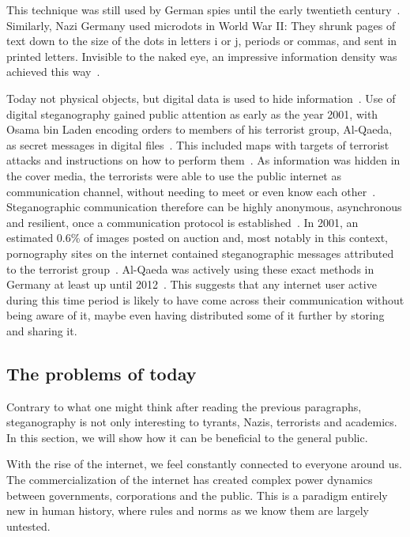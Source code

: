 This technique was still used by German spies until the early twentieth century~\cite{petitcolasInformationHidingSurvey1999}. Similarly, Nazi Germany used microdots in World War II: They shrunk pages of text down to the size of the dots in letters i or j, periods or commas, and sent in printed letters. Invisible to the naked eye, an impressive information density was achieved this way~\cite{dembartEndUserHide2001,petitcolasInformationHidingSurvey1999}.

Today not physical objects, but digital data is used to hide information~\cite{bennettLinguisticSteganographySurvey2004}. Use of digital steganography gained public attention as early as the year 2001, with Osama bin Laden encoding orders to members of his terrorist group, Al-Qaeda, as secret messages in digital files~\cite{dembartEndUserHide2001,schneierTerroristsSteganography2001}. This included maps with targets of terrorist attacks and instructions on how to perform them~\cite{schneierTerroristsSteganography2001}. As information was hidden in the cover media, the terrorists were able to use the public internet as communication channel, without needing to meet or even know each other~\cite{schneierTerroristsSteganography2001}. Steganographic communication therefore can be highly anonymous, asynchronous and resilient, once a communication protocol is established~\cite{schneierTerroristsSteganography2001}. In 2001, an estimated 0.6\% of images posted on auction and, most notably in this context, pornography sites on the internet contained steganographic messages attributed to the terrorist group~\cite{kolataVeiledMessagesTerror2001}. Al-Qaeda was actively using these exact methods in Germany at least up until 2012~\cite{robertsonDocumentsRevealQaedas2012}. This suggests that any internet user active during this time period is likely to have come across their communication without being aware of it, maybe even having distributed some of it further by storing and sharing it.

\subsection{The problems of today}
\label{sec:theProblemsOfToday}
Contrary to what one might think after reading the previous paragraphs, steganography is not only interesting to tyrants, Nazis, terrorists and academics. In this section, we will show how it can be beneficial to the general public.

With the rise of the internet, we feel constantly connected to everyone around us. The commercialization of the internet has created complex power dynamics between governments, corporations and the public. This is a paradigm entirely new in human history, where rules and norms as we know them are largely untested.

